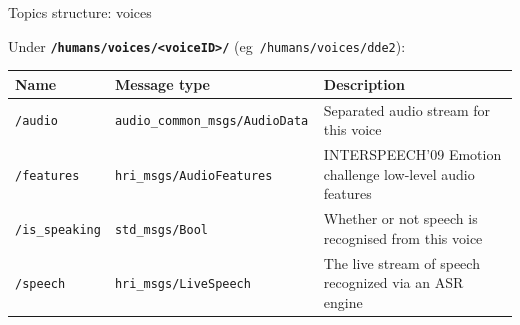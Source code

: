 \documentclass[xcolor=table,aspectratio=169]{beamer}
\begin{document}
\begin{frame}{Topics structure: voices}

    Under \textbf{\texttt{/humans/voices/<voiceID>/}} (eg~\texttt{/humans/voices/dde2}):

    \scriptsize
    \begin{tabular}{@{}p{2.5cm}p{4.5cm}p{6cm}@{}}
        \toprule
        \textbf{Name} & \textbf{Message type}         & \textbf{Description}                                                \\ \midrule
        \texttt{/audio       } & \texttt{audio\_common\_msgs/AudioData  } & Separated audio stream for this voice                     \\
        \texttt{/features    } & \texttt{hri\_msgs/AudioFeatures} & INTERSPEECH’09 Emotion challenge low-level audio features \\
        \texttt{/is\_speaking} & \texttt{std\_msgs/Bool         } & Whether or not speech is recognised from this voice       \\
        \texttt{/speech      } & \texttt{hri\_msgs/LiveSpeech       } & The live stream of speech recognized via an ASR engine \\
        \bottomrule               
\end{tabular}
    
\end{frame}
\end{document}
